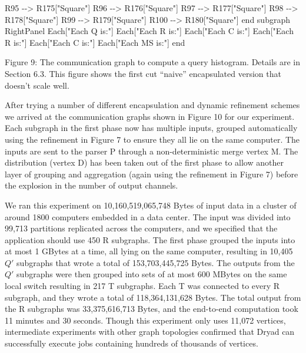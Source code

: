 \documentclass[
]{article}
\newenvironment{Shaded}{}{}
\newcommand{\NormalTok}[1]{#1}
\begin{document}
\begin{Shaded}
\begin{Highlighting}[]
\NormalTok{        R95 {-}{-}\textgreater{} R175["Square"]}
\NormalTok{        R96 {-}{-}\textgreater{} R176["Square"]}
\NormalTok{        R97 {-}{-}\textgreater{} R177["Square"]}
\NormalTok{        R98 {-}{-}\textgreater{} R178["Square"]}
\NormalTok{        R99 {-}{-}\textgreater{} R179["Square"]}
\NormalTok{        R100 {-}{-}\textgreater{} R180["Square"]}
\NormalTok{    end}
\NormalTok{    subgraph RightPanel}
\NormalTok{        Each["Each Q is:"]}
\NormalTok{        Each["Each R is:"]}
\NormalTok{        Each["Each C is:"]}
\NormalTok{        Each["Each R is:"]}
\NormalTok{        Each["Each C is:"]}
\NormalTok{        Each["Each MS is:"]}
\NormalTok{    end}
\end{Highlighting}
\end{Shaded}

Figure 9: The communication graph to compute a query histogram. Details
are in Section 6.3. This figure shows the first cut ``naive''
encapsulated version that doesn't scale well.

After trying a number of different encapsulation and dynamic refinement
schemes we arrived at the communication graphs shown in Figure 10 for
our experiment. Each subgraph in the first phase now has multiple
inputs, grouped automatically using the refinement in Figure 7 to ensure
they all lie on the same computer. The inputs are sent to the parser P
through a non-deterministic merge vertex M. The distribution (vertex D)
has been taken out of the first phase to allow another layer of grouping
and aggregation (again using the refinement in Figure 7) before the
explosion in the number of output channels.

We ran this experiment on 10,160,519,065,748 Bytes of input data in a
cluster of around 1800 computers embedded in a data center. The input
was divided into 99,713 partitions replicated across the computers, and
we specified that the application should use 450 R subgraphs. The first
phase grouped the inputs into at most 1 GBytes at a time, all lying on
the same computer, resulting in 10,405 \(Q'\) subgraphs that wrote a
total of 153,703,445,725 Bytes. The outputs from the \(Q'\) subgraphs
were then grouped into sets of at most 600 MBytes on the same local
switch resulting in 217 T subgraphs. Each T was connected to every R
subgraph, and they wrote a total of 118,364,131,628 Bytes. The total
output from the R subgraphs was 33,375,616,713 Bytes, and the end-to-end
computation took 11 minutes and 30 seconds. Though this experiment only
uses 11,072 vertices, intermediate experiments with other graph
topologies confirmed that Dryad can successfully execute jobs containing
hundreds of thousands of vertices.
\end{document}
